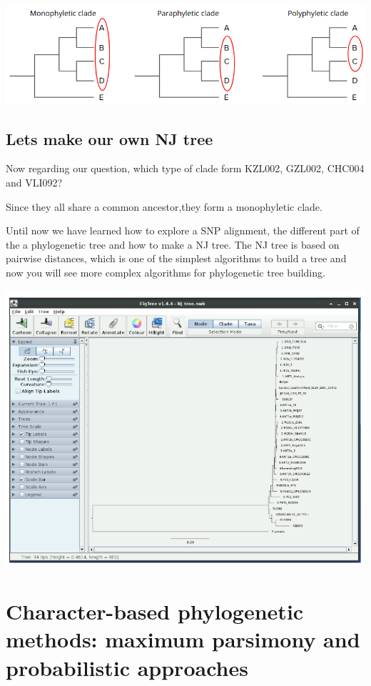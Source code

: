 \documentclass[
  letterpaper,
]{book}
\begin{document}
\includegraphics{assets/images/chapters/phylogenomics/15.png}

\hypertarget{lets-make-our-own-nj-tree-1}{%
\subsection{Lets make our own NJ
tree}\label{lets-make-our-own-nj-tree-1}}

Now regarding our question, which type of clade form KZL002, GZL002,
CHC004 and VLI092?

Since they all share a common ancestor,they form a monophyletic clade.

Until now we have learned how to explore a SNP alignment, the different
part of the a phylogenetic tree and how to make a NJ tree. The NJ tree
is based on pairwise distances, which is one of the simplest algorithms
to build a tree and now you will see more complex algorithms for
phylogenetic tree building.

\includegraphics{assets/images/chapters/phylogenomics/16.png}

\hypertarget{character-based-phylogenetic-methods-maximum-parsimony-and-probabilistic-approaches}{%
\section{Character-based phylogenetic methods: maximum parsimony and
probabilistic
approaches}\label{character-based-phylogenetic-methods-maximum-parsimony-and-probabilistic-approaches}}
\end{document}

